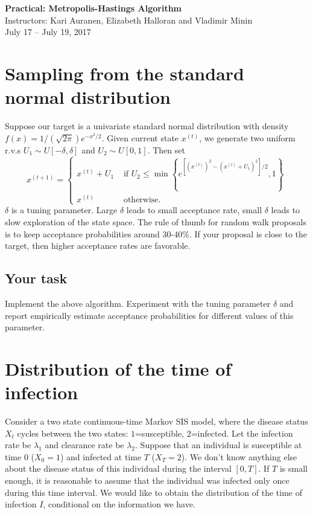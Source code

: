 \documentclass[11pt]{article}
\numberwithin{algorithm}{section}
\theoremstyle{remark}
\theoremstyle{definition}
\numberwithin{equation}{section}
\numberwithin{figure}{section}
\begin{document}


\begin{center}
  \textbf{\Large Practical: Metropolis-Hastings Algorithm}\\
  {\large Instructors: Kari Auranen, Elizabeth Halloran and Vladimir Minin}\\
  {\large July 17 -- July 19, 2017}
\end{center}

\section*{Sampling from the standard normal distribution}
Suppose our target is a univariate standard normal distribution with density $f(x) = 1/(\sqrt{2\pi})e^{-x^2/2}$.
Given current state $x^{(t)}$, we generate two uniform r.v.s $U_1 \sim U[-\delta,\delta]$ and 
$U_2 \sim U[0,1]$. Then set
\[
x^{(t+1)} = 
\begin{cases}
  x^{(t)} + U_1 &\text{ if } U_2 \le \min\left\{e^{\left[\left(x^{(t)}\right)^2 - (x^{(t)}+U_1)^2\right]/2},1\right\} \\
  x^{(t)} & \text{ otherwise}.
\end{cases}
\]
$\delta$ is a tuning parameter. Large $\delta$ leads to small acceptance rate, small $\delta$ leads to slow
exploration of the state space. The rule of thumb for random walk proposals is to keep acceptance probabilities
around 30-40\%. If your proposal is close to the target, then higher acceptance rates are favorable.


\subsection*{Your task}
Implement the above algorithm. Experiment with the tuning parameter $\delta$ and report empirically estimate
acceptance probabilities for different values of this parameter.

\section*{Distribution of the time of infection}
Consider a two state continuous-time Markov SIS model, where the disease status $X_t$ cycles between the two states: 
$1$=susceptible, $2$=infected. Let the infection rate be $\lambda_1$ and clearance rate be $\lambda_2$.
Suppose that an individual is susceptible at time $0$ ($X_0 = 1$) and infected at time $T$ ($X_T=2$). We don't know
anything else about the disease status of this individual during the interval $[0,T]$. If $T$ is small enough, 
it is reasonable to assume that the individual was infected only once during this time interval. We would like 
to obtain the distribution of the time of infection $I$, conditional on the information we have.
\end{document}
